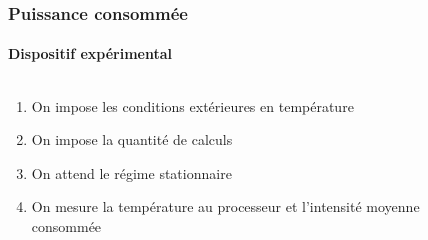 \documentclass[a4paper,11pt]{beamer}
\begin{document}
\begin{frame}
    \frametitle{Puissance consommée}
    \framesubtitle{Dispositif expérimental}

    \begin{columns}
        \begin{column}{0.5\textwidth}
            \begin{enumerate}
                \item On impose les conditions extérieures en température
                \item On impose la quantité de calculs
                \item On attend le régime stationnaire
                \item On mesure la température au processeur et l'intensité moyenne consommée
            \end{enumerate}
        \end{column}
        \begin{column}{0.5\textwidth}
        \end{column}
    \end{columns}
\end{frame}
\end{document}
